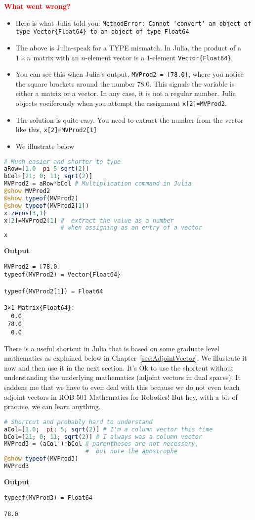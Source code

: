 \textcolor{red}{\bf \large What went wrong?}
\begin{itemize}
\item Here is what Julia told you: \texttt{MethodError: Cannot `convert` an object of type Vector\{Float64\} to an object of type Float64}
\item The above is Julia-speak for a TYPE mismatch. In Julia, the product of a $1 \times n $ matrix with an $n$-element vector is a $1$-element \texttt{Vector\{Float64\}}. 
    \item You can see this when Julia's output, \texttt{MVProd2 = [78.0]}, where you notice the square brackets around the number $78.0$. This signals the variable is either a matrix or a vector. In any case, it is not a regular number. Julia objects vociferously when you attempt the assignment \texttt{x[2]=MVProd2}.
    \item The solution is quite easy. You need to extract the number from the vector like this, \texttt{x[2]=MVProd2[1]}
    \item We illustrate below
\end{itemize}
\begin{lstlisting}[language=Julia,style=mystyle]
# Much easier and shorter to type
aRow=[1.0  pi 5 sqrt(2)]
bCol=[21; 0; 11; sqrt(2)]
MVProd2 = aRow*bCol # Multiplication command in Julia
@show MVProd2
@show typeof(MVProd2)
@show typeof(MVProd2[1])
x=zeros(3,1)
x[2]=MVProd2[1] #  extract the value as a number 
                # when assigning as an entry of a vector
x
\end{lstlisting}
\textbf{Output} 
\begin{verbatim}
MVProd2 = [78.0]
typeof(MVProd2) = Vector{Float64}

typeof(MVProd2[1]) = Float64

3×1 Matrix{Float64}:
  0.0
 78.0
  0.0
\end{verbatim}

There is a useful shortcut in Julia that is based on some graduate level mathematics as explained below in Chapter~\ref{sec:AdjointVector}. We illustrate it now and then use it in the next section. It's Ok to use the shortcut without understanding the underlying mathematics (adjoint vectors in dual spaces). It saddens me that we have to even deal with this because we do not even teach adjoint vectors in ROB 501 Mathematics for Robotics! But hey, with a bit of practice, we can learn anything.\\

\begin{lstlisting}[language=Julia,style=mystyle]
# Shortcut and probably hard to understand
aCol=[1.0;  pi; 5; sqrt(2)] # I'm a column vector this time
bCol=[21; 0; 11; sqrt(2)] # I always was a column vector
MVProd3 = (aCol')*bCol # parentheses are not necessary, 
                       #  but note the apostrophe
@show typeof(MVProd3)
MVProd3
\end{lstlisting}
\textbf{Output} 
\begin{verbatim}
typeof(MVProd3) = Float64

78.0
\end{verbatim}

